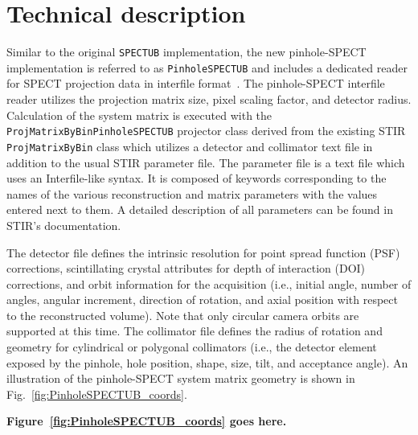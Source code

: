 \documentclass[utf8]{FrontiersinHarvard} %
\begin{document}
\section{Technical description}

Similar to the original \texttt{SPECTUB} implementation, the new pinhole-SPECT implementation is referred to as \texttt{PinholeSPECTUB} and includes a dedicated reader for SPECT projection data in interfile format~\cite{interfile}. The pinhole-SPECT interfile reader utilizes the projection matrix size, pixel scaling factor, and detector radius. Calculation of the system matrix is executed with the \texttt{ProjMatrixByBinPinholeSPECTUB} projector class derived from the existing STIR \texttt{ProjMatrixByBin} class which utilizes a detector and collimator text file in addition to the usual STIR parameter file. The parameter file is a text file which uses an Interfile-like syntax. It is composed of keywords corresponding to the names of the various reconstruction and matrix parameters with the values entered next to them. A detailed description of all parameters can be found in STIR's documentation.

The detector file defines the intrinsic resolution for point spread function (PSF) corrections, scintillating crystal attributes for depth of interaction (DOI) corrections, and orbit information for the acquisition (i.e., initial angle, number of angles, angular increment, direction of rotation, and axial position with respect to the reconstructed volume). Note that only circular camera orbits are supported at this time. The collimator file defines the radius of rotation and geometry for cylindrical or polygonal collimators (i.e., the detector element exposed by the pinhole, hole position, shape, size, tilt, and acceptance angle). An illustration of the pinhole-SPECT system matrix geometry is shown in Fig.~\ref{fig:PinholeSPECTUB_coords}.

\noindent \textbf{Figure~\ref{fig:PinholeSPECTUB_coords} goes here.}
\end{document}
